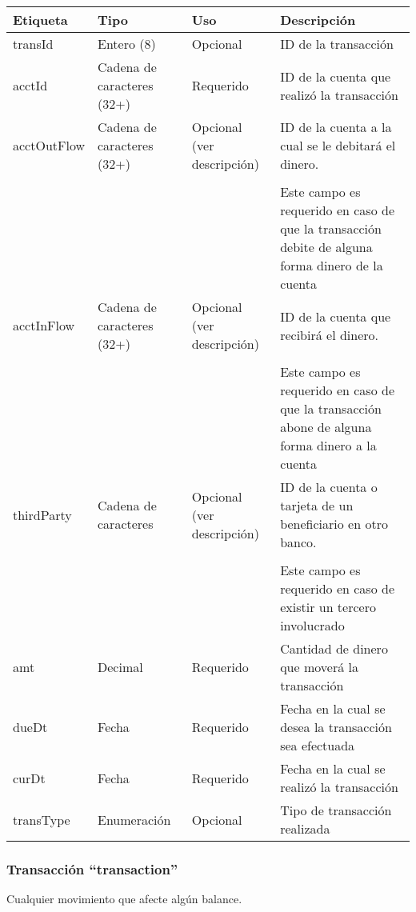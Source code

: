 \begin{center}
\begin{longtable}{|>{\centering\arraybackslash}p{}|>{\centering\arraybackslash}p{}|>{\centering\arraybackslash}p{}|>{\centering\arraybackslash}p{}|}
\hline 
\bfseries {Etiqueta} & \bfseries {Tipo} & \bfseries {Uso} & \bfseries {Descripción} \\ 
\hline
transId & Entero (8) & Opcional & ID de la transacción \\
\hline 
acctId & Cadena de caracteres (32+) & Requerido & ID de la cuenta que realizó la transacción \\ 
\hline 
acctOutFlow & Cadena de caracteres (32+) & Opcional (ver descripción) & ID de la cuenta a la cual se le debitará el dinero.
\\ & & & \\
& & & Este campo es requerido en caso de que la transacción debite de alguna forma dinero de la cuenta \\
\hline 
acctInFlow & Cadena de caracteres (32+) & Opcional (ver descripción) & ID de la cuenta que recibirá el dinero.
\\ & & & \\
& & & Este campo es requerido en caso de que la transacción abone de alguna forma dinero a la cuenta \\
\hline
thirdParty & Cadena de caracteres & Opcional (ver descripción) & ID de la cuenta o tarjeta de un beneficiario en otro banco.
\\ & & & \\
& & & Este campo es requerido en caso de existir un tercero involucrado \\
\hline
amt & Decimal & Requerido & Cantidad de dinero que moverá la transacción \\
\hline 
dueDt & Fecha & Requerido & Fecha en la cual se desea la transacción sea efectuada \\
\hline 
curDt & Fecha & Requerido & Fecha en la cual se realizó la transacción \\
\hline 
transType & Enumeración & Opcional & Tipo de transacción realizada \\
\hline 
\end{longtable}
\end{center}

\subsubsection{Transacción ``transaction''}
Cualquier movimiento que afecte algún balance.

